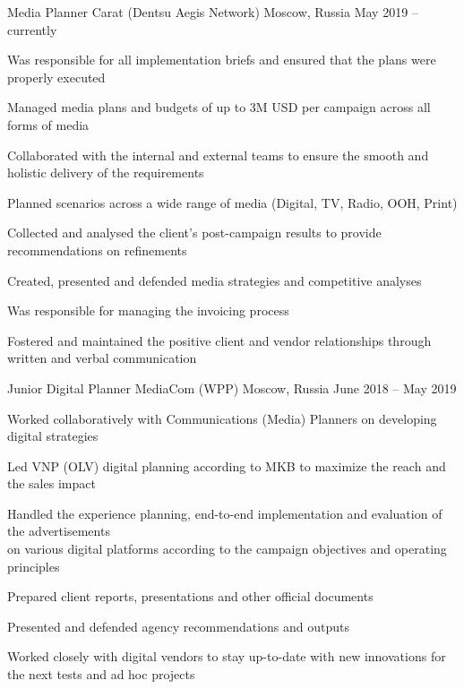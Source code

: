\documentclass[11pt, a4paper]{awesome-cv}
\begin{document}
\begin{cventries}
\cventry
	{Media Planner}
	{Carat (Dentsu Aegis Network)}
	{Moscow, Russia}
	{May 2019 -- currently}
	{
		\begin{cvitems}
			\item {Was responsible for all implementation briefs and ensured that the plans were properly executed}
			\item {Managed media plans and budgets of up to 3M USD per campaign across all forms of media}
			\item {Collaborated with the internal and external teams to ensure the smooth and holistic delivery of the requirements}
			\item {Planned scenarios across a wide range of media (Digital, TV, Radio, OOH, Print)}
			\item {Collected and analysed the client's post-campaign results to provide recommendations on refinements}
			\item {Created, presented and defended media strategies and competitive analyses}
			\item {Was responsible for managing the invoicing process}
			\item {Fostered and maintained the positive client and vendor relationships through written and verbal communication}
		\end{cvitems}
	}
	
\cventry
	{Junior Digital Planner}
	{MediaCom (WPP)}
	{Moscow, Russia}
	{June 2018 -- May 2019}
	{
		\begin{cvitems}
			\item {Worked collaboratively with Communications (Media) Planners on developing digital strategies}
			\item {Led VNP (OLV) digital planning according to MKB to maximize the reach and the sales impact}
			\item {Handled the experience planning, end-to-end implementation and evaluation of the advertisements\\on various digital platforms according to the campaign objectives and operating principles}
			\item {Prepared client reports, presentations and other official documents}
			\item {Presented and defended agency recommendations and outputs}
			\item {Worked closely with digital vendors to stay up-to-date with new innovations for the next tests and ad hoc projects}
		\end{cvitems}
	}
	
\end{cventries}
\end{document}
